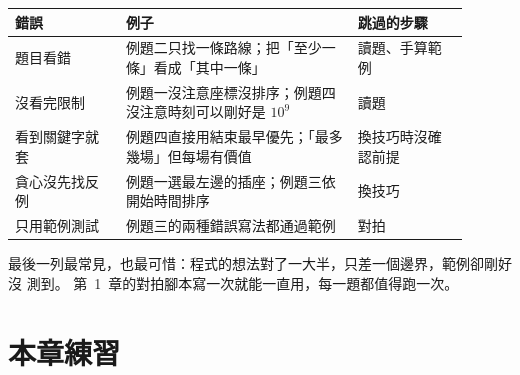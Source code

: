 \begin{center}
\begin{tabular}{p{0.22\linewidth}p{0.46\linewidth}p{0.22\linewidth}}
\toprule
錯誤 & 例子 & 跳過的步驟 \\
\midrule
題目看錯 & 例題二只找一條路線；把「至少一條」看成「其中一條」 & 讀題、手算範例 \\
沒看完限制 & 例題一沒注意座標沒排序；例題四沒注意時刻可以剛好是 $10^9$ & 讀題 \\
看到關鍵字就套 & 例題四直接用結束最早優先；「最多幾場」但每場有價值 & 換技巧時沒確認前提 \\
貪心沒先找反例 & 例題一選最左邊的插座；例題三依開始時間排序 & 換技巧 \\
只用範例測試 & 例題三的兩種錯誤寫法都通過範例 & 對拍 \\
\bottomrule
\end{tabular}
\end{center}

最後一列最常見，也最可惜：程式的想法對了一大半，只差一個邊界，範例卻剛好沒
測到。 第~1~章的對拍腳本寫一次就能一直用，每一題都值得跑一次。

\section{本章練習}
\label{sec:cap-exercises}

